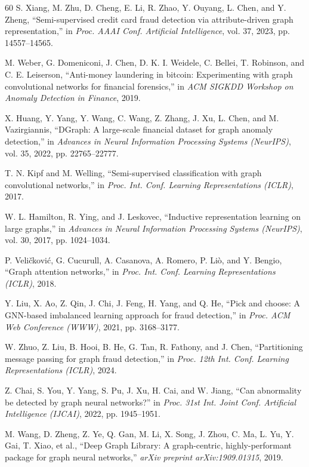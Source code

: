 \documentclass[10pt,a4paper,twocolumn]{article}
\begin{document}
\begin{thebibliography}{60}
 S. Xiang, M. Zhu, D. Cheng, E. Li, R. Zhao, Y. Ouyang, L. Chen, and Y. Zheng, ``Semi-supervised credit card fraud detection via attribute-driven graph representation,'' in \textit{Proc. AAAI Conf. Artificial Intelligence}, vol. 37, 2023, pp. 14557--14565.

 M. Weber, G. Domeniconi, J. Chen, D. K. I. Weidele, C. Bellei, T. Robinson, and C. E. Leiserson, ``Anti-money laundering in bitcoin: Experimenting with graph convolutional networks for financial forensics,'' in \textit{ACM SIGKDD Workshop on Anomaly Detection in Finance}, 2019.

 X. Huang, Y. Yang, Y. Wang, C. Wang, Z. Zhang, J. Xu, L. Chen, and M. Vazirgiannis, ``DGraph: A large-scale financial dataset for graph anomaly detection,'' in \textit{Advances in Neural Information Processing Systems (NeurIPS)}, vol. 35, 2022, pp. 22765--22777.

 T. N. Kipf and M. Welling, ``Semi-supervised classification with graph convolutional networks,'' in \textit{Proc. Int. Conf. Learning Representations (ICLR)}, 2017.

 W. L. Hamilton, R. Ying, and J. Leskovec, ``Inductive representation learning on large graphs,'' in \textit{Advances in Neural Information Processing Systems (NeurIPS)}, vol. 30, 2017, pp. 1024--1034.

 P. Veli\v{c}kovi\'{c}, G. Cucurull, A. Casanova, A. Romero, P. Li\`{o}, and Y. Bengio, ``Graph attention networks,'' in \textit{Proc. Int. Conf. Learning Representations (ICLR)}, 2018.

 Y. Liu, X. Ao, Z. Qin, J. Chi, J. Feng, H. Yang, and Q. He, ``Pick and choose: A GNN-based imbalanced learning approach for fraud detection,'' in \textit{Proc. ACM Web Conference (WWW)}, 2021, pp. 3168--3177.

 W. Zhuo, Z. Liu, B. Hooi, B. He, G. Tan, R. Fathony, and J. Chen, ``Partitioning message passing for graph fraud detection,'' in \textit{Proc. 12th Int. Conf. Learning Representations (ICLR)}, 2024.

 Z. Chai, S. You, Y. Yang, S. Pu, J. Xu, H. Cai, and W. Jiang, ``Can abnormality be detected by graph neural networks?'' in \textit{Proc. 31st Int. Joint Conf. Artificial Intelligence (IJCAI)}, 2022, pp. 1945--1951.

 M. Wang, D. Zheng, Z. Ye, Q. Gan, M. Li, X. Song, J. Zhou, C. Ma, L. Yu, Y. Gai, T. Xiao, et al., ``Deep Graph Library: A graph-centric, highly-performant package for graph neural networks,'' \textit{arXiv preprint arXiv:1909.01315}, 2019.


\end{thebibliography}
\end{document}
